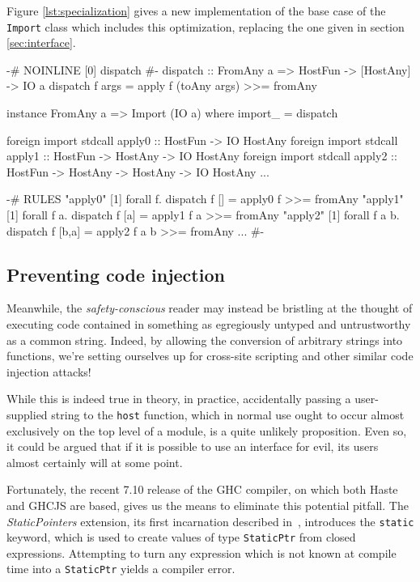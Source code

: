 \documentclass{sigplanconf}
\begin{document}
Figure \ref{lst:specialization} gives a new implementation of the base case
of the \lstinline!Import! class which includes this optimization, replacing
the one given in section \ref{sec:interface}.

\begin{listingfloat}
\begin{code}
{-# NOINLINE [0] dispatch #-}
dispatch :: FromAny a => HostFun -> [HostAny] -> IO a
dispatch f args = apply f (toAny args) >>= fromAny

instance FromAny a => Import (IO a) where
  import_ = dispatch

foreign import stdcall apply0 ::
  HostFun -> IO HostAny
foreign import stdcall apply1 ::
  HostFun -> HostAny -> IO HostAny
foreign import stdcall apply2 ::
  HostFun -> HostAny -> HostAny -> IO HostAny
...

{-# RULES
"apply0" [1] forall f. dispatch f [] =
               apply0 f >>= fromAny
"apply1" [1] forall f a. dispatch f [a] =
               apply1 f a >>= fromAny
"apply2" [1] forall f a b. dispatch f [b,a] =
               apply2 f a b >>= fromAny
...
 #-}
\end{code}
\caption{Specializing the \lstinline!host! base case}
\label{lst:specialization}
\end{listingfloat}

\subsection{Preventing code injection}
\label{sec:safe_host}
Meanwhile, the \emph{safety-conscious} reader may instead be bristling at the
thought of executing code contained in something as egregiously untyped and
untrustworthy as a common string.
Indeed, by allowing the conversion of arbitrary strings
into functions, we're setting ourselves up for cross-site scripting and other
similar code injection attacks!

While this is indeed true in theory, in practice, accidentally passing a
user-supplied string to the \lstinline!host! function, which in normal use
ought to occur almost exclusively on the top level of a module, is a quite
unlikely proposition. Even so, it could be argued that if it is possible to use
an interface for evil, its users almost certainly will at some point.

Fortunately, the recent 7.10 release of the GHC compiler, on which both Haste
and GHCJS are based, gives us the means to eliminate this potential pitfall.
The \emph{StaticPointers} extension, its
first incarnation described in\ \cite{cloudhaskell}, introduces the
\lstinline!static! keyword, which is used to create values of type
\lstinline!StaticPtr! from closed expressions. Attempting to turn any
expression which is not known at compile time into a \lstinline!StaticPtr!
yields a compiler error.
\end{document}
